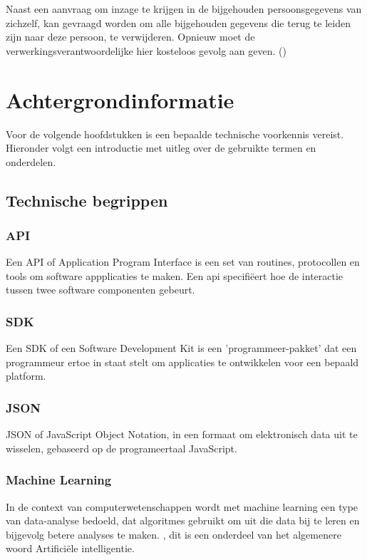 Naast een aanvraag om inzage te krijgen in de bijgehouden persoonsgegevens van zichzelf, kan gevraagd worden om alle bijgehouden gegevens die terug te leiden zijn naar deze persoon, te verwijderen. Opnieuw moet de verwerkingsverantwoordelijke hier kosteloos gevolg aan geven. (\textcite{Commissie2016}) 

\section{Achtergrondinformatie}
Voor de volgende hoofdstukken is een bepaalde technische voorkennis vereist. Hieronder volgt een introductie met uitleg over de gebruikte termen en onderdelen. 

\subsection{Technische begrippen}
\subsubsection{API}
Een API of Application Program Interface is een set van routines, protocollen en tools om software appplicaties te maken. Een api specifiëert hoe de interactie tussen twee software componenten gebeurt. 
\textcite{QuinStreet2019}

\subsubsection{SDK}
Een SDK of een Software Development Kit is een 'programmeer-pakket' dat een programmeur ertoe in staat stelt om applicaties te ontwikkelen voor een bepaald platform. \textcite{QuinStreet2019}

\subsubsection{JSON}
JSON of JavaScript Object Notation, in een formaat om elektronisch data uit te wisselen, gebaseerd op de programeertaal JavaScript. \textcite{QuinStreet2019}

\subsubsection{Machine Learning}
In de context van computerwetenschappen wordt met machine learning een type van data-analyse bedoeld, 
dat algoritmes gebruikt om uit die data bij te leren en bijgevolg betere analyses te maken. \textcite{QuinStreet2019}, dit is een onderdeel van het algemenere woord Artificiële intelligentie. 

